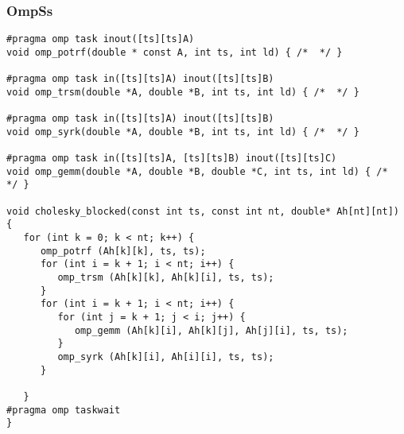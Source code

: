 \begin{frame}
  \frametitle{OmpSs}
  \vspace{-4mm}
  \begin{block}{}
\begin{lstlisting}[basicstyle=\scriptsize\ttfamily]
#pragma omp task inout([ts][ts]A)
void omp_potrf(double * const A, int ts, int ld) { /*  */ }

#pragma omp task in([ts][ts]A) inout([ts][ts]B)
void omp_trsm(double *A, double *B, int ts, int ld) { /*  */ }

#pragma omp task in([ts][ts]A) inout([ts][ts]B)
void omp_syrk(double *A, double *B, int ts, int ld) { /*  */ }

#pragma omp task in([ts][ts]A, [ts][ts]B) inout([ts][ts]C)
void omp_gemm(double *A, double *B, double *C, int ts, int ld) { /*  */ }

void cholesky_blocked(const int ts, const int nt, double* Ah[nt][nt])
{
   for (int k = 0; k < nt; k++) {
      omp_potrf (Ah[k][k], ts, ts);
      for (int i = k + 1; i < nt; i++) {
         omp_trsm (Ah[k][k], Ah[k][i], ts, ts);
      }
      for (int i = k + 1; i < nt; i++) {
         for (int j = k + 1; j < i; j++) {
            omp_gemm (Ah[k][i], Ah[k][j], Ah[j][i], ts, ts);
         }
         omp_syrk (Ah[k][i], Ah[i][i], ts, ts);
      }

   }
#pragma omp taskwait
}
\end{lstlisting}
  \end{block}
\end{frame}
